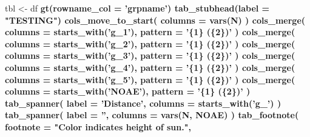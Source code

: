 \documentclass[]{article}
\newenvironment{Shaded}{\begin{snugshade}}{\end{snugshade}}
\newcommand{\DataTypeTok}[1]{\textcolor[rgb]{0.13,0.29,0.53}{#1}}
\newcommand{\KeywordTok}[1]{\textcolor[rgb]{0.13,0.29,0.53}{\textbf{#1}}}
\newcommand{\NormalTok}[1]{#1}
\newcommand{\OperatorTok}[1]{\textcolor[rgb]{0.81,0.36,0.00}{\textbf{#1}}}
\newcommand{\StringTok}[1]{\textcolor[rgb]{0.31,0.60,0.02}{#1}}
\begin{document}
\begin{Shaded}
\begin{Highlighting}[]
\NormalTok{tbl <-}\StringTok{ }\NormalTok{df  }\OperatorTok{%>%}
\StringTok{  }\KeywordTok{gt}\NormalTok{(}\DataTypeTok{rowname_col =} \StringTok{'grpname'}\NormalTok{) }\OperatorTok{%>%}
\StringTok{  }\KeywordTok{tab_stubhead}\NormalTok{(}\DataTypeTok{label =} \StringTok{"TESTING"}\NormalTok{) }\OperatorTok{%>%}
\StringTok{  }\KeywordTok{cols_move_to_start}\NormalTok{(}
    \DataTypeTok{columns =} \KeywordTok{vars}\NormalTok{(N)}
\NormalTok{  ) }\OperatorTok{%>%}
\StringTok{  }\KeywordTok{cols_merge}\NormalTok{(}
    \DataTypeTok{columns =} \KeywordTok{starts_with}\NormalTok{(}\StringTok{'g_1'}\NormalTok{),}
    \DataTypeTok{pattern =} \StringTok{'\{1\} (\{2\})'}
\NormalTok{  ) }\OperatorTok{%>%}
\StringTok{  }\KeywordTok{cols_merge}\NormalTok{(}
    \DataTypeTok{columns =} \KeywordTok{starts_with}\NormalTok{(}\StringTok{'g_2'}\NormalTok{),}
    \DataTypeTok{pattern =} \StringTok{'\{1\} (\{2\})'}
\NormalTok{  ) }\OperatorTok{%>%}
\StringTok{  }\KeywordTok{cols_merge}\NormalTok{(}
    \DataTypeTok{columns =} \KeywordTok{starts_with}\NormalTok{(}\StringTok{'g_3'}\NormalTok{),}
    \DataTypeTok{pattern =} \StringTok{'\{1\} (\{2\})'}
\NormalTok{  ) }\OperatorTok{%>%}
\StringTok{  }\KeywordTok{cols_merge}\NormalTok{(}
    \DataTypeTok{columns =} \KeywordTok{starts_with}\NormalTok{(}\StringTok{'g_4'}\NormalTok{),}
    \DataTypeTok{pattern =} \StringTok{'\{1\} (\{2\})'}
\NormalTok{  ) }\OperatorTok{%>%}
\StringTok{  }\KeywordTok{cols_merge}\NormalTok{(}
    \DataTypeTok{columns =} \KeywordTok{starts_with}\NormalTok{(}\StringTok{'g_5'}\NormalTok{),}
    \DataTypeTok{pattern =} \StringTok{'\{1\} (\{2\})'}
\NormalTok{  ) }\OperatorTok{%>%}
\StringTok{  }\KeywordTok{cols_merge}\NormalTok{(}
    \DataTypeTok{columns =} \KeywordTok{starts_with}\NormalTok{(}\StringTok{'NOAE'}\NormalTok{),}
    \DataTypeTok{pattern =} \StringTok{'\{1\} (\{2\})'}
\NormalTok{  ) }\OperatorTok{%>%}
\StringTok{  }\KeywordTok{tab_spanner}\NormalTok{(}
    \DataTypeTok{label =} \StringTok{'Distance'}\NormalTok{,}
    \DataTypeTok{columns =} \KeywordTok{starts_with}\NormalTok{(}\StringTok{'g_'}\NormalTok{)}
\NormalTok{  ) }\OperatorTok{%>%}
\StringTok{  }\KeywordTok{tab_spanner}\NormalTok{(}
    \DataTypeTok{label =} \StringTok{''}\NormalTok{,}
    \DataTypeTok{columns =} \KeywordTok{vars}\NormalTok{(N, NOAE)}
\NormalTok{  ) }\OperatorTok{%>%}
\StringTok{  }\KeywordTok{tab_footnote}\NormalTok{(}
    \DataTypeTok{footnote =} \StringTok{"Color indicates height of sun."}\NormalTok{,}
}}}}}}}}}}}}
\end{Highlighting}
\end{Shaded}
\end{document}
